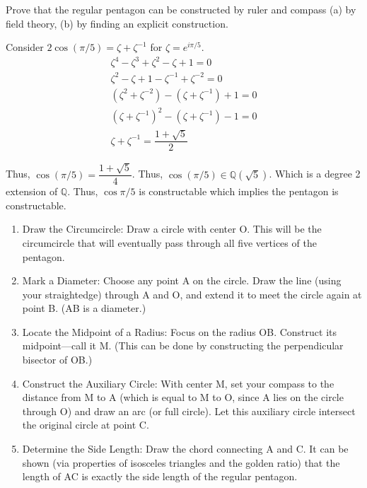 \documentclass[12pt, letterpaper]{article}
\newcommand{\Q}{\mathbb{Q}}
\begin{document}
\begin{problem}{}
    Prove that the regular pentagon can be constructed by ruler and compass (a) by field theory, (b) by finding an explicit construction.
\end{problem}
\begin{problemproof}
    Consider $2\cos (\pi/5)=\zeta+\zeta^{-1}$ for $\zeta=e^{i\pi/5}$.
    \begin{align*}
        \zeta^4 - \zeta^3 + \zeta^2 - \zeta + 1 = 0\\
        \zeta^2 - \zeta + 1 - \zeta^{-1} + \zeta^{-2} = 0\\
        (\zeta^2 + \zeta^{-2}) - (\zeta + \zeta^{-1}) + 1=0\\
        (\zeta + \zeta^{-1})^2 - (\zeta + \zeta^{-1}) -1=0\\
        \zeta + \zeta^{-1} = \dfrac{1+\sqrt{5}}{2}
    \end{align*}

    Thus, $\cos(\pi/5)=\dfrac{1+\sqrt{5}}{4}$. Thus, $\cos(\pi/5) \in \Q(\sqrt{5})$. Which is a degree 2 extension of $\Q$. Thus, $\cos{\pi/5}$ is constructable which implies the pentagon is constructable.

    \begin{enumerate}
        \item Draw the Circumcircle:
        Draw a circle with center O. This will be the circumcircle that will eventually pass through all five vertices of the pentagon.
        
        \item Mark a Diameter:
        Choose any point A on the circle. Draw the line (using your straightedge) through A and O, and extend it to meet the circle again at point B. (AB is a diameter.)
        
        \item Locate the Midpoint of a Radius:
        Focus on the radius OB. Construct its midpoint—call it M. (This can be done by constructing the perpendicular bisector of OB.)
        
        \item Construct the Auxiliary Circle:
        With center M, set your compass to the distance from M to A (which is equal to M to O, since A lies on the circle through O) and draw an arc (or full circle). Let this auxiliary circle intersect the original circle at point C.
        
        \item Determine the Side Length:
        Draw the chord connecting A and C. It can be shown (via properties of isosceles triangles and the golden ratio) that the length of AC is exactly the side length of the regular pentagon.
        

\end{enumerate}
\end{problemproof}
\end{document}
